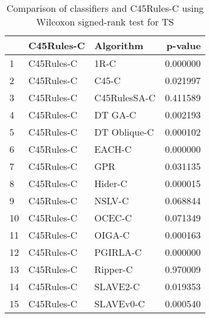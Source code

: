 \begin{table}
\footnotesize
\caption{Comparison of classifiers and C45Rules-C using Wilcoxon signed-rank test for TS}
\label{tab:C45Rules-C wilcoxon TS comparison}
\begin{tabular}{lllr}
\hline
 & C45Rules-C & Algorithm & p-value \\
\hline
1 & C45Rules-C & 1R-C & 0.000000 \\
2 & C45Rules-C & C45-C & 0.021997 \\
3 & C45Rules-C & C45RulesSA-C & 0.411589 \\
4 & C45Rules-C & DT GA-C & 0.002193 \\
5 & C45Rules-C & DT Oblique-C & 0.000102 \\
6 & C45Rules-C & EACH-C & 0.000000 \\
7 & C45Rules-C & GPR & 0.031135 \\
8 & C45Rules-C & Hider-C & 0.000015 \\
9 & C45Rules-C & NSLV-C & 0.068844 \\
10 & C45Rules-C & OCEC-C & 0.071349 \\
11 & C45Rules-C & OIGA-C & 0.000163 \\
12 & C45Rules-C & PGIRLA-C & 0.000000 \\
13 & C45Rules-C & Ripper-C & 0.970009 \\
14 & C45Rules-C & SLAVE2-C & 0.019353 \\
15 & C45Rules-C & SLAVEv0-C & 0.000540 \\
\hline
\end{tabular}
\end{table}
